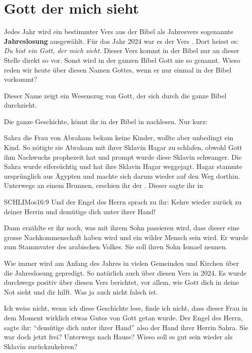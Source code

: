 \section{Gott der mich sieht}
Jedes Jahr wird ein bestimmter Vers aus der Bibel als Jahresvers sogenannte \textbf{Jahreslosung} ausgewählt. Für das Jahr 2024 war es der Vers . Dort heisst es: \textit{Du bist ein Gott, der mich sieht.}
Dieser Vers kommt in der Bibel nur an dieser Stelle direkt so vor. Sonst wird in der ganzen Bibel Gott nie so genannt. Wieso reden wir heute über diesen Namen Gottes, wenn er nur einmal in der Bibel vorkommt?

Dieser Name zeigt ein Wesenszug von Gott, der sich durch die ganze Bibel durchzieht. 

Die ganze Geschichte, könnt ihr in der Bibel in  nachlesen. Nur kurz:

Sahra die Frau von Abraham bekam keine Kinder, wollte aber unbedingt ein Kind. So nötigte sie Abraham mit ihrer Sklavin Hagar zu schlafen, obwohl Gott ihm Nachwuchs prophezeit hat und prompt wurde diese Sklavin schwanger. Die Sahra wurde eifersüchtig und hat ihre Sklavin Hagar weggejagt. Hagar stammte ursprünglich aus Ägypten und machte sich darum wieder auf den Weg dorthin. Unterwegs an einem Brunnen, erschien ihr der . Dieser sagte ihr in \begin{bibelbox}{SCHL}{IMos}{16:9}
    Und der Engel des Herrn sprach zu ihr: Kehre wieder zurück zu deiner Herrin und demütige dich unter ihrer Hand!
\end{bibelbox}
Dann erzählte er ihr noch, was mit ihrem Sohn passieren wird, dass dieser eine grosse Nachkommenschaft haben wird und ein wilder Mensch sein wird. Er wurde zum Stammvater des arabischen Volkes. Sie soll ihren Sohn Ismael nennen.

Wie immer wird am Anfang des Jahres in vielen Gemeinden und Kirchen über die Jahreslosung gepredigt. So natürlich auch über diesen Vers in 2024. Es wurde durchwegs positiv über diesen Vers berichtet, vor allem, wie Gott dich in deine Not sieht und dir hilft. Was ja auch nicht falsch ist. 

Ich weiss nicht, wenn ich diese Geschichte lese, finde ich nicht, dass dieser Frau in dem Moment wirklich etwas Gutes von Gott getan wurde. Der Engel des Herrn, sagte ihr: \enquote{demütige dich unter ihrer Hand} also der Hand ihrer Herrin Sahra. Sie war doch jetzt frei? Unterwegs nach Hause? Wieso soll es gut sein wieder als Sklavin zurückzukehren?

